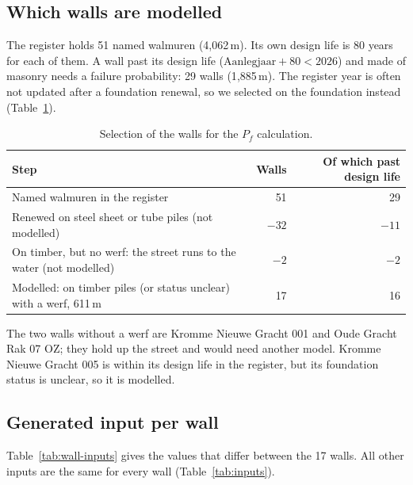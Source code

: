 \subsection{Which walls are modelled}\label{app:data-selection}

The register holds 51 named walmuren (4{,}062\,m). Its own design life is
80 years for each of them. A wall past its design life ($\text{Aanlegjaar} + 80
< 2026$) and made of masonry needs a failure probability: 29 walls (1{,}885\,m).
The register year is often not updated after a foundation renewal, so we
selected on the foundation instead (Table~\ref{tab:selection}).

\begin{table}[htbp]
\centering
\small
\caption{Selection of the walls for the $P_f$ calculation.}
\label{tab:selection}
\begin{tabularx}{\textwidth}{@{}X r r@{}}
\toprule
Step & Walls & Of which past design life \\
\midrule
Named walmuren in the register & 51 & 29 \\
\quad Renewed on steel sheet or tube piles (not modelled) & $-32$ & $-11$ \\
\quad On timber, but no werf: the street runs to the water (not modelled) & $-2$ & $-2$ \\
Modelled: on timber piles (or status unclear) with a werf, 611\,m & 17 & 16 \\
\bottomrule
\end{tabularx}
\end{table}

The two walls without a werf are Kromme Nieuwe Gracht 001 and Oude Gracht
Rak 07 OZ; they hold up the street and would need another model. Kromme
Nieuwe Gracht 005 is within its design life in the register, but its
foundation status is unclear, so it is modelled.

\subsection{Generated input per wall}\label{app:data-walls}

Table~\ref{tab:wall-inputs} gives the values that differ between the 17
walls. All other inputs are the same for every wall (Table~\ref{tab:inputs}).

